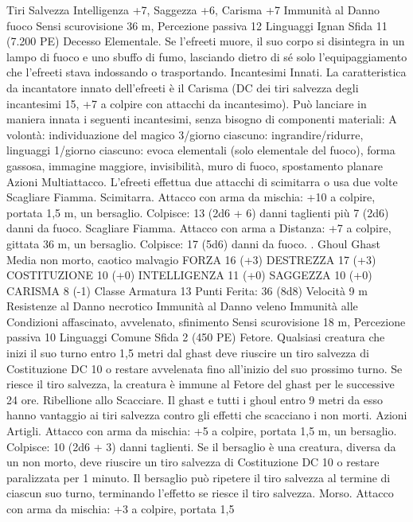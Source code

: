 \begin{multicols}{2}
Tiri Salvezza Intelligenza +7, Saggezza +6, Carisma +7
Immunità al Danno fuoco
Sensi scurovisione 36 m, Percezione passiva 12
Linguaggi Ignan
Sfida 11 (7.200 PE)
Decesso Elementale. Se l’efreeti muore, il suo corpo si
disintegra in un lampo di fuoco e uno sbuffo di fumo, lasciando
dietro di sé solo l’equipaggiamento che l’efreeti stava indossando
o trasportando.
Incantesimi Innati. La caratteristica da incantatore innato
dell’efreeti è il Carisma (DC dei tiri salvezza degli incantesimi
15, +7 a colpire con attacchi da incantesimo). Può lanciare in
maniera innata i seguenti incantesimi, senza bisogno di
componenti materiali:
A volontà: individuazione del magico
3/giorno ciascuno: ingrandire/ridurre, linguaggi
1/giorno ciascuno: evoca elementali (solo elementale del fuoco),
forma gassosa, immagine maggiore, invisibilità, muro di fuoco,
spostamento planare
Azioni
Multiattacco. L’efreeti effettua due attacchi di scimitarra o usa
due volte Scagliare Fiamma.
Scimitarra. Attacco con arma da mischia: +10 a colpire, portata
1,5 m, un bersaglio.
Colpisce: 13 (2d6 + 6) danni taglienti più 7 (2d6) danni da fuoco.
Scagliare Fiamma. Attacco con arma a Distanza: +7 a colpire,
gittata 36 m, un bersaglio.
Colpisce: 17 (5d6) danni da fuoco.
.
Ghoul
Ghast
Media non morto, caotico malvagio
FORZA 16 (+3)
DESTREZZA 17 (+3)
COSTITUZIONE 10 (+0)
INTELLIGENZA 11 (+0)
SAGGEZZA 10 (+0)
CARISMA 8 (-1)
Classe Armatura 13
\hspace*{0pt}\hfill{Punti Ferita}: 36 (8d8)
Velocità 9 m
Resistenze al Danno necrotico
Immunità al Danno veleno
Immunità alle Condizioni affascinato, avvelenato, sfinimento
Sensi scurovisione 18 m, Percezione passiva 10
Linguaggi Comune
Sfida 2 (450 PE)
Fetore. Qualsiasi creatura che inizi il suo turno entro 1,5 metri dal
ghast deve riuscire un tiro salvezza di Costituzione DC 10 o restare
avvelenata fino all’inizio del suo prossimo turno. Se riesce il tiro
salvezza, la creatura è immune al Fetore del ghast per le successive
24 ore.
Ribellione allo Scacciare. Il ghast e tutti i ghoul entro 9 metri da
esso hanno vantaggio ai tiri salvezza contro gli effetti che
scacciano i non morti.
Azioni
Artigli. Attacco con arma da mischia: +5 a colpire, portata 1,5
m, un bersaglio.
Colpisce: 10 (2d6 + 3) danni taglienti. Se il bersaglio è una
creatura, diversa da un non morto, deve riuscire un tiro salvezza
di Costituzione DC 10 o restare paralizzata per 1 minuto. Il
bersaglio può ripetere il tiro salvezza al termine di ciascun suo
turno, terminando l’effetto se riesce il tiro salvezza.
Morso. Attacco con arma da mischia: +3 a colpire, portata 1,5

\end{multicols}
